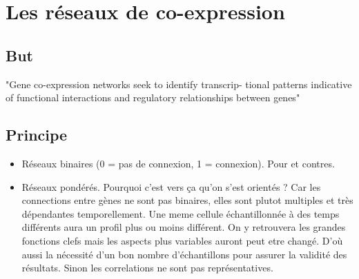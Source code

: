 

\section{Les réseaux de  co-expression}


\subsection{But}
"Gene co-expression networks seek to identify transcrip- tional patterns indicative of functional interactions and regulatory relationships between genes" %

\subsection{Principe}
\begin{itemize}
    \item Réseaux binaires (0 = pas de connexion, 1 = connexion). Pour et contres.
    \item Réseaux pondérés. Pourquoi c'est vers ça qu'on s'est orientés ? Car les connections entre gènes ne sont pas binaires, elles sont plutot multiples et très dépendantes temporellement. Une meme cellule échantillonnée à des temps différents aura un profil plus ou moins différent. On y retrouvera les grandes fonctions clefs mais les aspects plus variables auront peut etre changé. D'où aussi la nécessité d'un bon nombre d'échantillons pour assurer la validité des résultats. Sinon les correlations ne sont pas représentatives.
\end{itemize}

